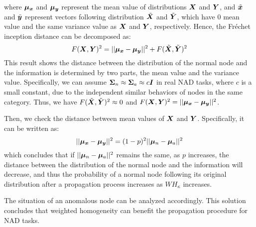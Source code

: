 where $\boldsymbol{\mu_x}$ and $\boldsymbol{\mu_y}$ represent the mean value of distributions $\boldsymbol{X}$ and $\boldsymbol{Y}$, and $\tilde{\boldsymbol{x}}$ and $\tilde{\boldsymbol{y}}$ represent vectors following distribution $\tilde{\boldsymbol{X}}$ and $\tilde{\boldsymbol{Y}}$, which have 0 mean value and the same variance value as $\boldsymbol{X}$ and $\boldsymbol{Y}$, respectively. Hence, the Fréchet inception distance can be decomposed as:
\begin{equation*}
F(\boldsymbol{X}, \boldsymbol{Y})^2=||\boldsymbol{\mu_x}-\boldsymbol{\mu_y}||^2+F(\tilde{\boldsymbol{X}}, \tilde{\boldsymbol{Y}})^2
\end{equation*}
This result shows the distance between the distribution of the normal node and the information is determined by two parts, the mean value and the variance value. Specifically, we can assume $\boldsymbol{\Sigma}_n\approx\boldsymbol{\Sigma}_a\approx c\boldsymbol{I}$ in real NAD tasks, where $c$ is a small constant, due to the independent similar behaviors of nodes in the same category. Thus, we have $F(\tilde{\boldsymbol{X}}, \tilde{\boldsymbol{Y}})^2\approx0$ and $F(\boldsymbol{X}, \boldsymbol{Y})^2=||\boldsymbol{\mu_x}-\boldsymbol{\mu_y}||^2$. 

Then, we check the distance between mean values of $\boldsymbol{X}$ and $\boldsymbol{Y}$. Specifically, it can be written as: 
\begin{equation*}
||\boldsymbol{\mu_x}-\boldsymbol{\mu_y}||^2=(1-p)^2||\boldsymbol{\mu}_n-\boldsymbol{\mu}_a||^2
\end{equation*}
which concludes that if $||\boldsymbol{\mu}_n-\boldsymbol{\mu}_a||^2$ remains the same, as $p$ increases, the distance between the distribution of the normal node and the information will decrease, and thus the probability of a normal node following its original distribution after a propagation process increases as $WH_\kappa$ increases. 

The situation of an anomalous node can be analyzed accordingly. This solution concludes that weighted homogeneity can benefit the propagation procedure for NAD tasks. {\hfill \qedsymbol}

